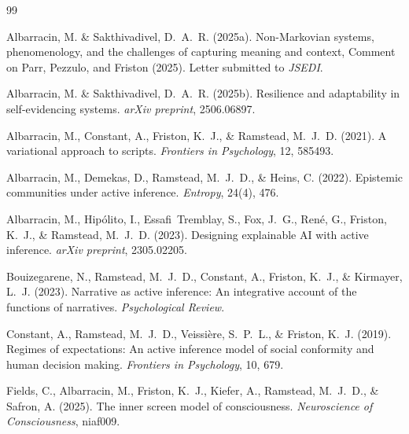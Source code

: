 \documentclass[11pt,a4paper]{article}
\theoremstyle{definition}
\begin{document}


\begin{thebibliography}{99}

Albarracin, M. \& Sakthivadivel, D.~A.~R. (2025a).
\newblock Non-{M}arkovian systems, phenomenology, and the challenges of capturing meaning and context, {C}omment on {P}arr, {P}ezzulo, and {F}riston (2025).
\newblock Letter submitted to \emph{JSEDI}.

Albarracin, M. \& Sakthivadivel, D.~A.~R. (2025b).
\newblock Resilience and adaptability in self-evidencing systems.
\newblock \emph{arXiv preprint}, 2506.06897.

Albarracin, M., Constant, A., Friston, K.~J., \& Ramstead, M.~J.~D. (2021).
\newblock A variational approach to scripts.
\newblock \emph{Frontiers in Psychology}, 12, 585493.

Albarracin, M., Demekas, D., Ramstead, M.~J.~D., \& Heins, C. (2022).
\newblock Epistemic communities under active inference.
\newblock \emph{Entropy}, 24(4), 476.

Albarracin, M., Hip\'{o}lito, I., Essafi~Tremblay, S., Fox, J.~G., Ren\'{e}, G., Friston, K.~J., \& Ramstead, M.~J.~D. (2023).
\newblock Designing explainable {AI} with active inference.
\newblock \emph{arXiv preprint}, 2305.02205.

Bouizegarene, N., Ramstead, M.~J.~D., Constant, A., Friston, K.~J., \& Kirmayer, L.~J. (2023).
\newblock Narrative as active inference: An integrative account of the functions of narratives.
\newblock \emph{Psychological Review}.

Constant, A., Ramstead, M.~J.~D., Veissi\`{e}re, S.~P.~L., \& Friston, K.~J. (2019).
\newblock Regimes of expectations: An active inference model of social conformity and human decision making.
\newblock \emph{Frontiers in Psychology}, 10, 679.

Fields, C., Albarracin, M., Friston, K.~J., Kiefer, A., Ramstead, M.~J.~D., \& Safron, A. (2025).
\newblock The inner screen model of consciousness.
\newblock \emph{Neuroscience of Consciousness}, niaf009.


\end{thebibliography}
\end{document}
